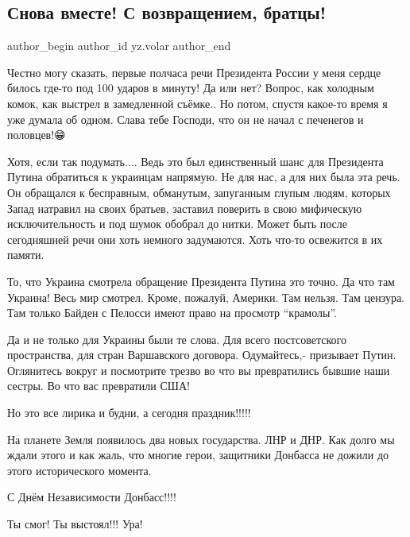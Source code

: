  
 
 
 
 
 
\subsection{Снова вместе! С возвращением, братцы!}
\label{sec:21_02_2022.yz.volar.1.snova_vmeste}
 
\ifcmt
 author_begin
   author_id yz.volar
 author_end
\fi

Честно могу сказать, первые полчаса речи Президента России у меня сердце билось
где-то под 100 ударов в минуту! Да или нет? Вопрос, как холодным комок, как
выстрел в замедленной съёмке.. Но потом, спустя какое-то время я уже думала об
одном. Слава тебе Господи, что он не начал с печенегов и половцев!😁


Хотя, если так подумать.... Ведь это был единственный шанс для Президента
Путина обратиться к украинцам напрямую. Не для нас, а для них была эта речь. Он
обращался к бесправным, обманутым, запуганным глупым людям, которых Запад
натравил на своих братьев, заставил поверить в свою мифическую исключительность
и под шумок обобрал до нитки. Может быть после сегодняшней речи они хоть
немного задумаются. Хоть что-то освежится в их памяти.

То, что Украина смотрела обращение Президента Путина это точно. Да что там
Украина! Весь мир смотрел. Кроме, пожалуй, Америки. Там нельзя. Там цензура.
Там только Байден с Пелосси имеют право на просмотр \enquote{крамолы}.

Да и не только для Украины были те слова. Для всего постсоветского
пространства, для стран Варшавского договора. Одумайтесь,- призывает Путин.
Оглянитесь вокруг и посмотрите трезво во что вы превратились бывшие наши
сестры. Во что вас превратили США!

Но это все лирика и будни, а сегодня праздник!!!!!

На планете Земля появилось два новых государства. ЛНР и ДНР. Как долго мы ждали
этого и как жаль, что многие герои, защитники Донбасса не дожили до этого
исторического момента.

С Днём Независимости Донбасс!!!!

Ты смог! Ты выстоял!!! Ура!

